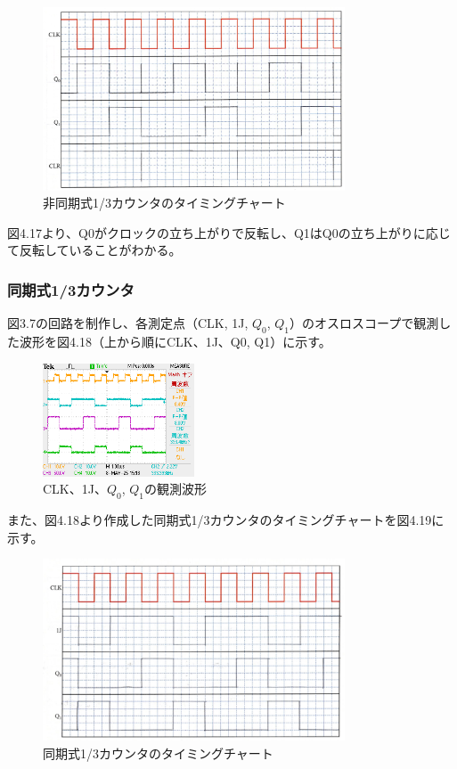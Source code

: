 \documentclass{jlreq}
\numberwithin{equation}{section}
\begin{document}
\begin{figure}[H]
  \centering
  \includegraphics[width=0.8\textwidth]{assets/hidoukichart.png}
  \caption{非同期式1/3カウンタのタイミングチャート}
\end{figure}

図4.17より、Q0がクロックの立ち上がりで反転し、Q1はQ0の立ち上がりに応じて反転していることがわかる。

\subsubsection{同期式1/3カウンタ}
図3.7の回路を制作し、各測定点（CLK, 1J, \(Q_0\), \(Q_1\)）のオスロスコープで観測した波形を図4.18（上から順にCLK、1J、Q0, Q1）に示す。

\begin{figure}[H]
  \centering
  \includegraphics[width=0.4\textwidth]{assets/douki.png}
  \caption{CLK、1J、\(Q_0\), \(Q_1\)の観測波形}
\end{figure}

また、図4.18より作成した同期式1/3カウンタのタイミングチャートを図4.19に示す。

\begin{figure}[H]
  \centering
  \includegraphics[width=0.8\textwidth]{assets/doukichart.png}
  \caption{同期式1/3カウンタのタイミングチャート}
\end{figure}
\end{document}
